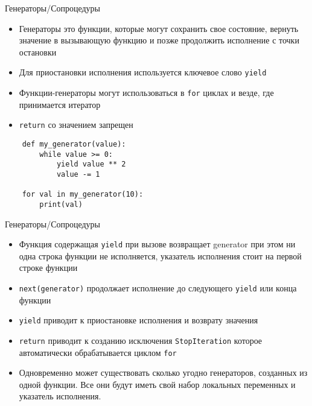 \documentclass{article}
\begin{document}
\begin{center} Генераторы/Сопроцедуры \end{center}
\begin{itemize}
    \item Генераторы это функции, которые могут сохранить свое состояние, вернуть
        значение в вызывающую функцию и позже продолжить исполнение с точки остановки
    \item Для приостановки исполнения используется ключевое слово \lstinline!yield!
    \item Функции-генераторы могут использоваться в \LARGE\lstinline!for! циклах и везде, где
        принимается итератор
    \item \lstinline!return! со значением запрещен
\end{itemize}
\vspace{15pt}
\begin{lstlisting}
    def my_generator(value):
        while value >= 0:
            yield value ** 2
            value -= 1

    for val in my_generator(10):
        print(val)
\end{lstlisting}
\newpage

\begin{center} Генераторы/Сопроцедуры \end{center}
\begin{itemize}
    \item Функция содержащая \lstinline!yield! при вызове возвращает generator
        при этом ни одна строка функции не исполняется, указатель исполнения стоит
        на первой строке функции
    \item \lstinline!next(generator)! продолжает исполнение до следующего
        \lstinline!yield! или конца функции
    \item \lstinline!yield! приводит к приостановке исполнения и возврату значения
    \item \lstinline!return! приводит к созданию исключения \lstinline!StopIteration!
        которое автоматически обрабатывается циклом \lstinline!for!
    \item Одновременно может существовать сколько угодно генераторов, созданных из одной функции.
        Все они будут иметь свой набор локальных переменных и указатель исполнения.
\end{itemize}
\newpage
\end{document}
